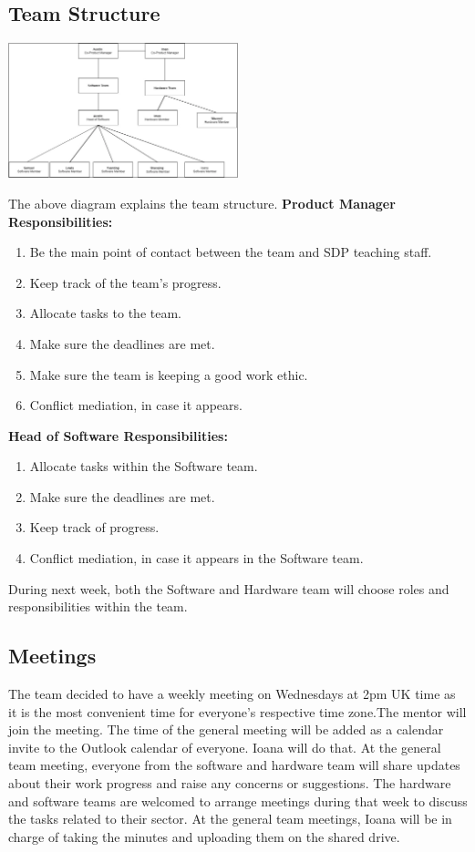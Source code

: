 \documentclass{article}
\begin{document}
\subsection{Team Structure}
\begin{center}
    \includegraphics [width=0.5\textwidth]{Team Structure.png}
\end{center}
The above diagram explains the team structure. 
\newline
\textbf{Product Manager Responsibilities: }
\begin{enumerate} 
    \item Be the main point of contact between the team  and SDP teaching staff. 
    \item Keep track of the team's progress.
    \item Allocate tasks to the team. 
    \item Make sure the deadlines are met. 
    \item Make sure the team is keeping a good work ethic. 
    \item Conflict mediation, in case it appears. 
\end{enumerate}
\textbf{Head of Software Responsibilities: }
\begin{enumerate} 
    \item Allocate tasks within the Software team.
    \item Make sure the deadlines are met. 
    \item Keep track of progress.
    \item Conflict mediation, in case it appears in the Software team. 
\end{enumerate}
During next week, both the Software and Hardware team will choose roles and responsibilities within the team.

\subsection{Meetings}
The team decided to have a weekly meeting on Wednesdays at 2pm UK time as it is the most convenient time for everyone's respective time zone.The mentor will join the meeting. The time of the general meeting will be added as a calendar invite to the Outlook calendar of everyone. Ioana will do that.  At the general team meeting, everyone from the software and hardware team will share updates about their work progress and raise any concerns or suggestions. The hardware and software teams are welcomed to arrange meetings during that week to discuss the tasks related to their sector. At the general team meetings, Ioana will be in charge of taking the minutes and uploading them on the shared drive. 
\end{document}
